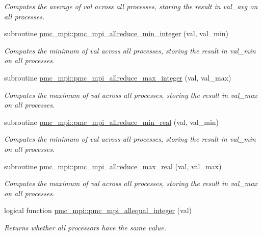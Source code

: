 \begin{DoxyCompactItemize}
\begin{DoxyCompactList}\small\item\em Computes the average of val across all processes, storing the result in val\+\_\+avg on all processes. \end{DoxyCompactList}\item 
subroutine \mbox{\hyperlink{namespacepmc__mpi_adf0ef14e00e2b7cf522926e5d6b757cb}{pmc\+\_\+mpi\+::pmc\+\_\+mpi\+\_\+allreduce\+\_\+min\+\_\+integer}} (val, val\+\_\+min)
\begin{DoxyCompactList}\small\item\em Computes the minimum of val across all processes, storing the result in val\+\_\+min on all processes. \end{DoxyCompactList}\item 
subroutine \mbox{\hyperlink{namespacepmc__mpi_a21063691a7e6791c71a89263c18bd7d4}{pmc\+\_\+mpi\+::pmc\+\_\+mpi\+\_\+allreduce\+\_\+max\+\_\+integer}} (val, val\+\_\+max)
\begin{DoxyCompactList}\small\item\em Computes the maximum of val across all processes, storing the result in val\+\_\+max on all processes. \end{DoxyCompactList}\item 
subroutine \mbox{\hyperlink{namespacepmc__mpi_acd75456e29bd2c7a400b6c050f8e9c04}{pmc\+\_\+mpi\+::pmc\+\_\+mpi\+\_\+allreduce\+\_\+min\+\_\+real}} (val, val\+\_\+min)
\begin{DoxyCompactList}\small\item\em Computes the minimum of val across all processes, storing the result in val\+\_\+min on all processes. \end{DoxyCompactList}\item 
subroutine \mbox{\hyperlink{namespacepmc__mpi_a56764a88a85a09a1c97a2ae512415633}{pmc\+\_\+mpi\+::pmc\+\_\+mpi\+\_\+allreduce\+\_\+max\+\_\+real}} (val, val\+\_\+max)
\begin{DoxyCompactList}\small\item\em Computes the maximum of val across all processes, storing the result in val\+\_\+max on all processes. \end{DoxyCompactList}\item 
logical function \mbox{\hyperlink{namespacepmc__mpi_aa5850392ee2226b1d9b0387849d33b42}{pmc\+\_\+mpi\+::pmc\+\_\+mpi\+\_\+allequal\+\_\+integer}} (val)
\begin{DoxyCompactList}\small\item\em Returns whether all processors have the same value. \end{DoxyCompactList}\item 

\end{DoxyCompactItemize}
